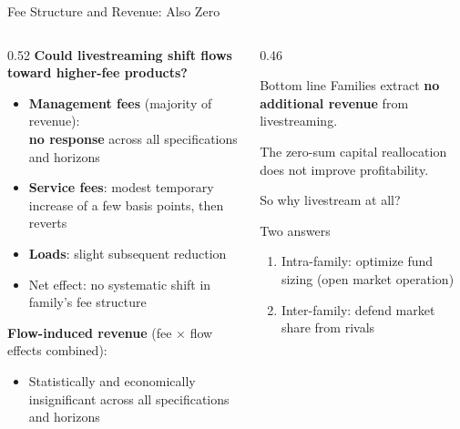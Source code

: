 \documentclass[11pt, aspectratio=169]{beamer}
\newcommand{\hl}[1]{\textcolor{myblue}{\textbf{#1}}}
\begin{document}
\begin{frame}{Fee Structure and Revenue: Also Zero}

\begin{columns}[T]
\begin{column}{0.52\textwidth}
\textbf{Could livestreaming shift flows toward higher-fee products?}

\medskip
\begin{itemize}
  \item \textbf{Management fees} (majority of revenue):\\
  \hl{no response} across all specifications and horizons
  \item \textbf{Service fees}: modest temporary increase
  of a few basis points, then reverts
  \item \textbf{Loads}: slight subsequent reduction
  \item Net effect: no systematic shift in family's fee structure
\end{itemize}

\medskip
\textbf{Flow-induced revenue} (fee $\times$ flow effects combined):
\begin{itemize}
  \item Statistically and economically insignificant
  across all specifications and horizons
\end{itemize}
\end{column}
\begin{column}{0.46\textwidth}
\begin{alertblock}{Bottom line}
  Families extract \hl{no additional revenue} from livestreaming.

  \medskip
  The zero-sum capital reallocation does not improve profitability.

  \medskip
  So why livestream at all?
\end{alertblock}

\vspace{0.2cm}
\begin{block}{Two answers}
  \begin{enumerate}
    \item Intra-family: optimize fund sizing (open market operation)
    \item Inter-family: defend market share from rivals
  \end{enumerate}
\end{block}
\end{column}
\end{columns}

\end{frame}
\end{document}
